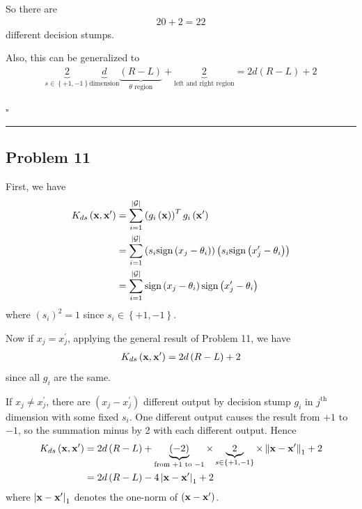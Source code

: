 \documentclass[12pt]{article}
\newcommand*{\QEDB}{\hfill\ensuremath{\square}}
\newcommand{\CBrackets}[1]{\left\{#1\right\}}
\newcommand{\ParTh}[1]{\left(#1\right)}
\newcommand{\BF}[1]{{\bf#1}}
\newcommand{\AbsVal}[1]{\left|#1\right|}
\newcommand{\VecAbsVal}[1]{\left\|#1\right\|}
\newcommand{\horrule}[1]{\rule{\linewidth}{#1}}
\begin{document}
So there are
\begin{align}
20+2=22
\end{align}
different decision stumps.

Also, this can be generalized to
\begin{align}
\underbrace{2}_{s\in\CBrackets{+1,-1}}\underbrace{d}_{\text{dimension}}{\underbrace{\ParTh{R-L}}_{\theta\text{ region}}}+\underbrace{2}_{\text{left and right region}}=2d\ParTh{R-L}+2
\end{align}

\QEDB

\horrule{0.5pt}

\subsection*{Problem 11}

First, we have
\begin{align}
K_{ds}\ParTh{\BF{x},\BF{x}^\prime}&=\sum_{i=1}^{\AbsVal{\mathcal{G}}}\ParTh{g_i\ParTh{\BF{x}}}^Tg_i\ParTh{\BF{x}^\prime}\\
&=\sum_{i=1}^{\AbsVal{\mathcal{G}}}\ParTh{s_i\text{sign}\ParTh{x_j-\theta_i}}\ParTh{s_i\text{sign}\ParTh{x^\prime_j-\theta_i}}\\
&=\sum_{i=1}^{\AbsVal{\mathcal{G}}}\text{sign}\ParTh{x_j-\theta_i}\text{sign}\ParTh{x^\prime_j-\theta_i}
\end{align}
where $\ParTh{s_i}^2=1$ since $s_i\in\CBrackets{+1,-1}$.

Now if $x_j=x^\prime_j$, applying the general result of Problem 11, we have
\begin{align}
K_{ds}\ParTh{\BF{x},\BF{x}^\prime}=2d\ParTh{R-L}+2
\end{align}
since all $g_i$ are the same.

If $x_j\neq x^\prime_j$, there are $\ParTh{x_j-x^\prime_j}$ different output by decision stump $g_i$ in $j^{\text{th}}$ dimension with some fixed $s_i$. One different output causes the result from $+1$ to $-1$, so the summation minus by 2 with each different output. Hence
\begin{align}
K_{ds}\ParTh{\BF{x},\BF{x}^\prime}&=2d\ParTh{R-L}+\underbrace{\ParTh{-2}}_{\text{from }+1\text{ to }-1}\times\underbrace{2}_{s\in\CBrackets{+1,-1}}\times\VecAbsVal{\BF{x}-\BF{x}^\prime}_1+2\\
&=2d\ParTh{R-L}-4\AbsVal{\BF{x}-\BF{x}^\prime}_1+2
\end{align}
where $\AbsVal{\BF{x}-\BF{x}^\prime}_1$ denotes the one-norm of $\ParTh{\BF{x}-\BF{x}^\prime}$.
\end{document}
